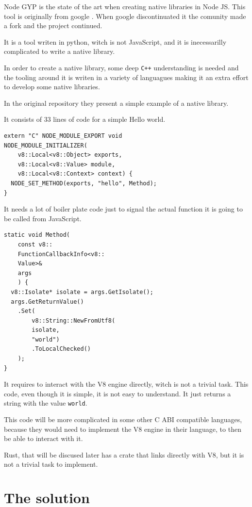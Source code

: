 \documentclass[10pt,journal,compsoc]{IEEEtran}
\begin{document}
Node GYP is the state of the art when creating native libraries in Node JS. This tool is originally from google \cite{FKNODE}. When google discontinuated it the comunity made a fork and the project continued. \cite{NODEGYP}

It is a tool writen in python, witch is not JavaScript, and it is inecessarilly complicated to write a native library.

In order to create a native library, some deep \verb|C++| understanding is needed and the tooling around it is writen in a variety of languagues making it an extra effort to develop some native libraries.

In the original repository they present a simple example of a native library. \cite{NODEGYP}

It consists of 33 lines of code for a simple Hello world.

\begin{lstlisting}
extern "C" NODE_MODULE_EXPORT void
NODE_MODULE_INITIALIZER(
    v8::Local<v8::Object> exports,
    v8::Local<v8::Value> module,
    v8::Local<v8::Context> context) {
  NODE_SET_METHOD(exports, "hello", Method);
}
\end{lstlisting}

It needs a lot of boiler plate code just to signal the actual function it is going to be called from JavaScript.

\begin{lstlisting}
static void Method(
    const v8::
    FunctionCallbackInfo<v8::
    Value>& 
    args
    ) {
  v8::Isolate* isolate = args.GetIsolate();
  args.GetReturnValue()
    .Set(
        v8::String::NewFromUtf8(
        isolate, 
        "world")
        .ToLocalChecked()
    );
}
\end{lstlisting}

It requires to interact with the V8 engine directly, witch is not a trivial task. This code, even though it is simple, it is not easy to understand. It just returns a string with the value \verb|world|.

This code will be more complicated in some other C ABI compatible languages, because they would need to implement the V8 engine in their language, to then be able to interact with it.

Rust, that will be discused later has a crate that links directly with V8, but it is not a trivial task to implement.

\section{The solution}
\end{document}
